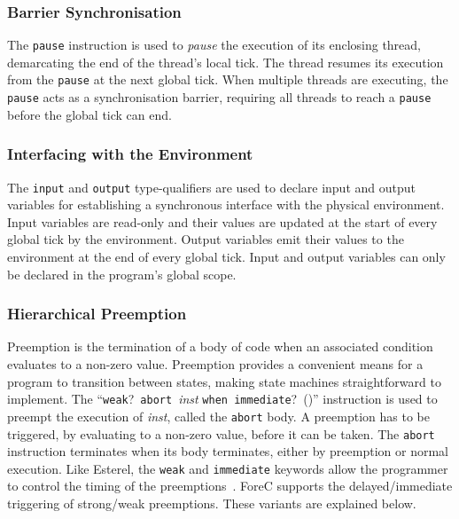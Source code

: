 
\subsubsection{Barrier Synchronisation}
The \verb$pause$ instruction is used to \emph{pause} the execution of its
enclosing thread, demarcating the end of the thread's local tick. The 
thread resumes its execution from the \verb$pause$ at the next global tick. 
When multiple threads are executing, the \verb$pause$ acts 
as a synchronisation barrier, requiring all threads to reach a
\verb$pause$ before the global tick can end.



\subsubsection{Interfacing with the Environment}
The \verb$input$ and \verb$output$ type-qualifiers are used to declare
input and output variables for establishing a synchronous interface with 
the physical environment. Input variables are read-only 
and their values are updated at the start of every global tick by the 
environment. Output variables emit their values to the environment at 
the end of every global tick. Input and output variables can only be 
declared in the program's global scope.



\subsubsection{Hierarchical Preemption}
Preemption is the termination of a body of code when an associated 
condition evaluates to a non-zero value. Preemption provides a 
convenient means for a program to transition between 
states, making state machines straightforward to implement.
The ``\verb$weak$?~\verb$abort$~\emph{inst} \verb$when immediate$?~(\expression{})''
instruction is used to preempt the execution of 
\emph{inst}, called the \verb$abort$ body. A preemption has to be
triggered, by evaluating \expression{} to a 
non-zero value, before it can be taken. 
The \verb$abort$ instruction terminates when its
body terminates, either by preemption or normal execution.
Like Esterel, the \verb$weak$ and \verb$immediate$ keywords 
allow the programmer to control the timing of the 
preemptions~\cite{timed_preemption}. ForeC supports the 
delayed/immediate triggering of strong/weak preemptions. 
These variants are explained below.


